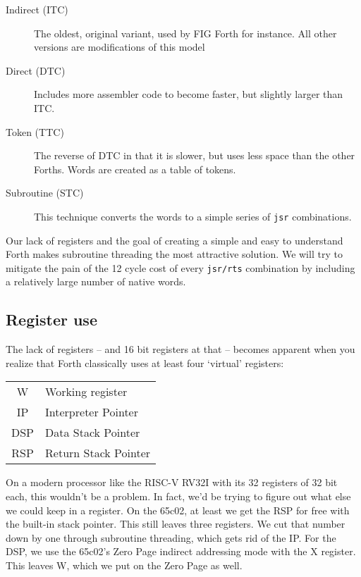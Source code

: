 \begin{description}
        \item [Indirect (ITC)] The oldest, original variant, used by FIG
                Forth for instance. All other versions are
                modifications of this model
        \item [Direct (DTC)] Includes more assembler code to become faster, but
                slightly larger than ITC. 
        \item [Token (TTC)] The reverse of DTC in that it is slower, but uses
                less space than the other Forths. Words are created as a table
                of tokens.
        \item [Subroutine (STC)] This technique converts the words to a simple
                series of \texttt{jsr} combinations. 
\end{description}

Our lack of registers and the goal of creating a simple and easy to understand
Forth makes subroutine threading the most attractive solution. We will try to
mitigate the pain of the 12 cycle cost of every \texttt{jsr/rts} combination by
including a relatively large number of native words. 


\subsection{Register use}

The lack of registers -- and 16 bit registers at that -- becomes apparent when
you realize that Forth classically uses at least four `virtual' registers:

\begin{table}[h !]
        \centering
        \label{tab:registers}
        \begin{tabular}{| c | l |}
                \hline
                W   & Working register\\
                IP  & Interpreter Pointer\\
                DSP & Data Stack Pointer\\
                RSP & Return Stack Pointer\\
                \hline
        \end{tabular}
\end{table}

On a modern processor like the RISC-V RV32I with its 32 registers
of 32 bit each, this wouldn't be a problem. In fact, we'd be trying to figure
out what else we could keep in a register. On the 65c02, at least we get the RSP
for free with the built-in stack pointer. This still leaves three registers. We
cut that number down by one through subroutine threading, which gets rid of the
IP. For the DSP, we use the 65c02's Zero Page indirect
addressing mode with the X register. This leaves W, which we
put on the Zero Page as well. 


